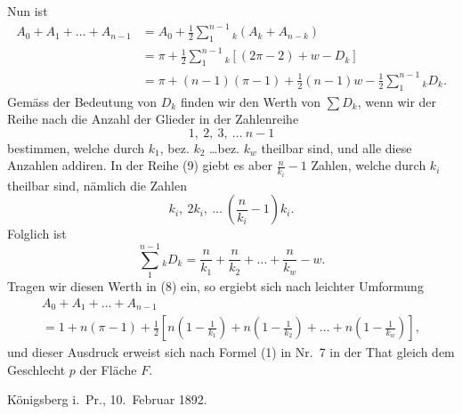 \documentclass{article}
\begin{document}
Nun ist
\[
\begin{aligned}
A_0 + A_1 + \dots + A_{n-1} &= A_0 + \frac{1}{2} \sum_1^{n-1} {}_k (A_k + A_{n-k}) \\
&= \pi + \frac{1}{2} \sum_1^{n-1} {}_k [(2\pi - 2) + w - D_k] \\
&= \pi + (n-1)(\pi-1) + \frac{1}{2}(n-1)w - \frac{1}{2} \sum_1^{n-1} {}_k D_k.
\end{aligned} \tag{8}
\]
Gemäss der Bedeutung von $D_k$ finden wir den Werth von $\displaystyle\sum D_k$, wenn wir der Reihe nach die Anzahl der Glieder in der Zahlenreihe
\[
1, \ 2, \ 3, \ \dots \ n - 1 \tag{9}
\]
bestimmen, welche durch $k_1$, bez. $k_2$ \dots bez. $k_w$ theilbar sind, und alle diese Anzahlen addiren. In der Reihe (9) giebt es aber $\frac{n}{k_i} - 1$ Zahlen, welche durch $k_i$ theilbar sind, nämlich die Zahlen
\[
k_i, \ 2k_i, \ \dots \ \left(\frac{n}{k_i} - 1\right) k_i.
\]
Folglich ist
\[
\sum_1^{n-1} {}_k D_k = \frac{n}{k_1} + \frac{n}{k_2} + \dots + \frac{n}{k_w} - w.
\]
Tragen wir diesen Werth in (8) ein, so ergiebt sich nach leichter Umformung
\[
\begin{aligned}
A_0 + A_1 + \dots + A_{n-1} \\
= 1 + n(\pi - 1) + \frac{1}{2} \left[ n\left(1 - \frac{1}{k_1}\right) + n\left(1 - \frac{1}{k_2}\right) + \dots + n\left(1 - \frac{1}{k_w}\right) \right],
\end{aligned} \tag{10}
\]
und dieser Ausdruck erweist sich nach Formel (1) in Nr.~7 in der That gleich dem Geschlecht $p$ der Fläche $F$.

Königsberg i.~Pr., 10.~Februar 1892.
\end{document}
